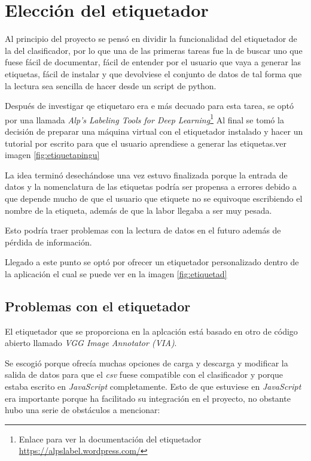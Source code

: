 \label{c.5}

\section{Elección del etiquetador}

Al principio del proyecto se pensó en dividir la funcionalidad del etiquetador de la del clasificador, por lo que una de las primeras tareas fue la de buscar uno que fuese fácil de documentar, fácil de entender por el usuario que vaya a generar las etiquetas, fácil de instalar y que devolviese el conjunto de datos de tal forma que la lectura sea sencilla de hacer desde un script de python.

Después de investigar qe etiquetaro era e más decuado para esta tarea, se optó por una llamada \textit{Alp's Labeling Tools for Deep Learning}\footnote{Enlace para ver la documentación del etiquetador \url{https://alpslabel.wordpress.com/}}
Al final se tomó la decisión de preparar una máquina virtual con el etiquetador instalado y hacer un tutorial por escrito para que el usuario aprendiese a generar las etiquetas.ver imagen \ref{fig:etiquetapingu}


La idea terminó desechándose una vez estuvo finalizada porque la entrada de datos y la nomenclatura de las etiquetas podría ser propensa a errores debido a que depende mucho de que el usuario que etiquete no se equivoque escribiendo el nombre de la etiqueta, además de que la labor llegaba a ser muy pesada.

Esto podría traer problemas con la lectura de datos en el futuro además de pérdida de información.

Llegado a este punto se optó por ofrecer un etiquetador personalizado dentro de la aplicación el cual se puede ver en la imagen \ref{fig:etiquetad}

\subsection{Problemas con el etiquetador}
El etiquetador que se proporciona en la aplcación está basado en otro de código abierto llamado \textit{VGG Image Annotator (VIA)}. 

Se escogió porque ofrecía muchas opciones de carga y descarga y modificar la salida de datos para que el \textit{csv} fuese compatible con el clasificador y porque estaba escrito en \textit{JavaScript} completamente. Esto de que estuviese en \textit{JavaScript} era importante porque ha facilitado su integración en el proyecto, no obstante hubo una serie de obstáculos a mencionar:


